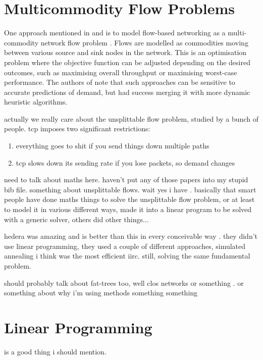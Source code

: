 \section{Multicommodity Flow Problems}
One approach mentioned in \cite{wellons:augmenting} and \cite{dai:dynamic} is to model flow-based networking as a multi-commodity network flow problem \cite[pp. 862--863]{cormen:algorithms}. Flows are modelled as commodities moving between various source and sink nodes in the network. This is an optimisation problem where the objective function can be adjusted depending on the desired outcomes, such as maximising overall throughput or maximising worst-case performance. The authors of \cite{wellons:augmenting} note that such approaches can be sensitive to accurate predictions of demand, but had success merging it with more dynamic heuristic algorithms. 

actually we really care about the unsplittable flow problem, studied by a bunch of people. tcp imposes two significant restrictions:

\begin{enumerate}
    \item everything goes to shit if you send things down multiple paths
    \item tcp slows down its sending rate if you lose packets, so demand changes
\end{enumerate}


need to talk about maths here. haven't put any of those papers into my stupid bib file. something about unsplittable flows. wait yes i have \cite{anag:mazing, bonsma:ufp, chakrabarti:ufp}. basically that smart people have done maths things to solve the unsplittable flow problem, or at least to model it in various different ways, \cite{walkowiak:residual} made it into a linear program to be solved with a generic solver, others did other things...

hedera was amazing and is better than this in every conceivable way \cite{alfares:hedera}. they didn't use linear programming, they used a couple of different approaches, simulated annealing i think was the most efficient iirc. still, solving the same fundamental problem.

should probably talk about fat-trees too, well clos networks or something \cite{alfares:fattree}. or something about why i'm using methods something something

\section{Linear Programming}

is a good thing i should mention.
